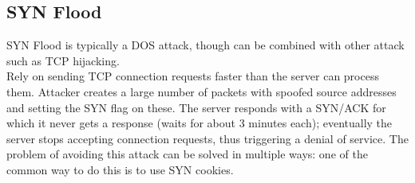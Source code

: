 \subsection{SYN Flood}
SYN Flood is typically a DOS attack, though can be combined with other attack such as TCP hijacking.\\
Rely on sending TCP connection requests faster than the server can process them. Attacker creates a large number of packets with spoofed source addresses and setting the SYN flag on these. The server responds with a SYN/ACK for which it never gets a response (waits for about 3 minutes each); eventually the server stops accepting connection requests, thus triggering a denial of service.
The problem of avoiding this attack can be solved in multiple ways: one of the common way to do this is to use SYN cookies.
